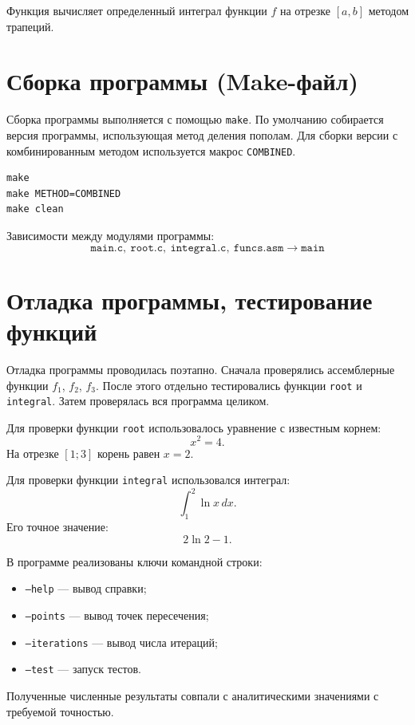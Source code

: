 \documentclass[a4paper,12pt,titlepage,final]{article}
\begin{document}
Функция вычисляет определенный интеграл функции $f$ на отрезке $[a,b]$ методом трапеций.

\newpage

\section{Сборка программы (Make-файл)}

Сборка программы выполняется с помощью \texttt{make}. По умолчанию собирается версия программы, использующая метод деления пополам. Для сборки версии с комбинированным методом используется макрос \texttt{COMBINED}.

\begin{verbatim}
make
make METHOD=COMBINED
make clean
\end{verbatim}

Зависимости между модулями программы:
\[
\texttt{main.c},\ \texttt{root.c},\ \texttt{integral.c},\ \texttt{funcs.asm}
\longrightarrow
\texttt{main}
\]

\newpage

\section{Отладка программы, тестирование функций}

Отладка программы проводилась поэтапно. Сначала проверялись ассемблерные функции $f_1$, $f_2$, $f_3$. После этого отдельно тестировались функции \texttt{root} и \texttt{integral}. Затем проверялась вся программа целиком.

Для проверки функции \texttt{root} использовалось уравнение с известным корнем:
\[
    x^2=4.
\]
На отрезке $[1;3]$ корень равен $x=2$.

Для проверки функции \texttt{integral} использовался интеграл:
\[
    \int_1^2 \ln x\,dx.
\]
Его точное значение:
\[
    2\ln2-1.
\]

В программе реализованы ключи командной строки:
\begin{itemize}
    \item \texttt{--help} --- вывод справки;
    \item \texttt{--points} --- вывод точек пересечения;
    \item \texttt{--iterations} --- вывод числа итераций;
    \item \texttt{--test} --- запуск тестов.
\end{itemize}

Полученные численные результаты совпали с аналитическими значениями с требуемой точностью.
\end{document}
